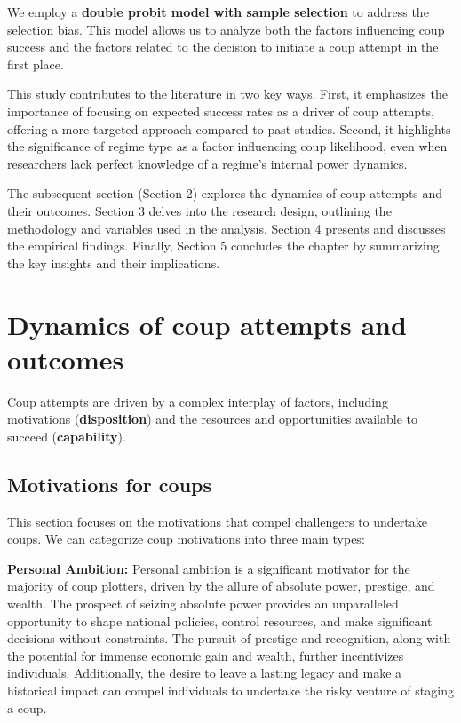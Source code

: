 \documentclass[
  12pt,
]{report}
\begin{document}
We employ a \textbf{double probit model with sample selection} to
address the selection bias. This model allows us to analyze both the
factors influencing coup success and the factors related to the decision
to initiate a coup attempt in the first place.

This study contributes to the literature in two key ways. First, it
emphasizes the importance of focusing on expected success rates as a
driver of coup attempts, offering a more targeted approach compared to
past studies. Second, it highlights the significance of regime type as a
factor influencing coup likelihood, even when researchers lack perfect
knowledge of a regime's internal power dynamics.

The subsequent section (Section 2) explores the dynamics of coup
attempts and their outcomes. Section 3 delves into the research design,
outlining the methodology and variables used in the analysis. Section 4
presents and discusses the empirical findings. Finally, Section 5
concludes the chapter by summarizing the key insights and their
implications.

\section{Dynamics of coup attempts and
outcomes}\label{dynamics-of-coup-attempts-and-outcomes}

Coup attempts are driven by a complex interplay of factors, including
motivations (\textbf{disposition}) and the resources and opportunities
available to succeed (\textbf{capability}).

\subsection{Motivations for coups}\label{motivations-for-coups}

This section focuses on the motivations that compel challengers to
undertake coups. We can categorize coup motivations into three main
types:

\textbf{Personal Ambition:} Personal ambition is a significant motivator
for the majority of coup plotters, driven by the allure of absolute
power, prestige, and wealth. The prospect of seizing absolute power
provides an unparalleled opportunity to shape national policies, control
resources, and make significant decisions without constraints. The
pursuit of prestige and recognition, along with the potential for
immense economic gain and wealth, further incentivizes individuals.
Additionally, the desire to leave a lasting legacy and make a historical
impact can compel individuals to undertake the risky venture of staging
a coup.
\end{document}
